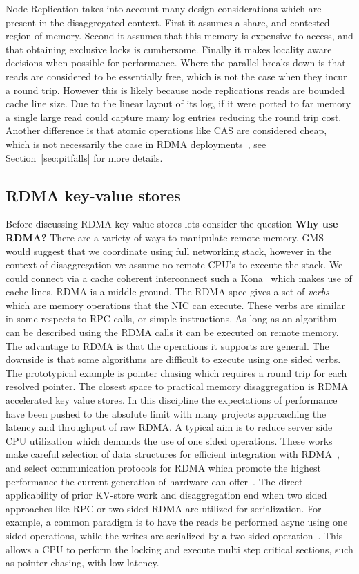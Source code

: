 Node Replication takes into account many design considerations which are present
in the disaggregated context. First it assumes a share, and contested region of
memory. Second it assumes that this memory is expensive to access, and that
obtaining exclusive locks is cumbersome. Finally it makes locality aware
decisions when possible for performance. Where the parallel breaks down is that
reads are considered to be essentially free, which is not the case when they
incur a round trip. However this is likely because node replications reads are
bounded cache line size. Due to the linear layout of its log, if it were ported
to far memory a single large read could capture many log entries reducing the
round trip cost.  Another difference is that atomic operations like CAS are
considered cheap, which is not necessarily the case in RDMA
deployments~\cite{design-guideline}, see Section~\ref{sec:pitfalls} for more
details. 


\subsection{RDMA key-value stores} 
Before discussing RDMA key value stores lets consider the question \textbf{Why
use RDMA?} There are a variety of ways to manipulate remote memory,
GMS~\cite{gms} would suggest that we coordinate using full networking stack,
however in the context of disaggregation we assume no remote CPU's to execute
the stack. We could connect via a cache coherent interconnect such a
Kona~\cite{kona} which makes use of cache lines. RDMA is a middle ground. The
RDMA spec gives a set of \textit{verbs} which are memory operations that the NIC
can execute. These verbs are similar in some respects to RPC calls, or simple
instructions. As long as an algorithm can be described using the RDMA calls it
can be executed on remote memory. The advantage to RDMA is that the operations
it supports are general. The downside is that some algorithms are difficult to
execute using one sided verbs. The prototypical example is pointer chasing which
requires a round trip for each resolved pointer.
The closest space to practical memory disaggregation is RDMA accelerated key
value stores. In this discipline the expectations of performance have been
pushed to the absolute limit with many projects approaching the latency and
throughput of raw RDMA. A typical aim is to reduce server side CPU utilization
which demands the use of one sided operations. These works make careful
selection of data structures for efficient integration with
RDMA~\cite{hopscotch,cuckoo}, and select communication protocols for RDMA which
promote the highest performance the current generation of hardware can
offer~\cite{herd,storm}. The direct applicability of prior KV-store work and
disaggregation end when two sided approaches like RPC or two sided RDMA are
utilized for serialization. For example, a common paradigm is to have the reads
be performed async using one sided operations, while the writes are serialized
by a two sided operation~\cite{pilaf}. This allows a CPU to perform the locking
and execute multi step critical sections, such as pointer chasing, with low
latency.

